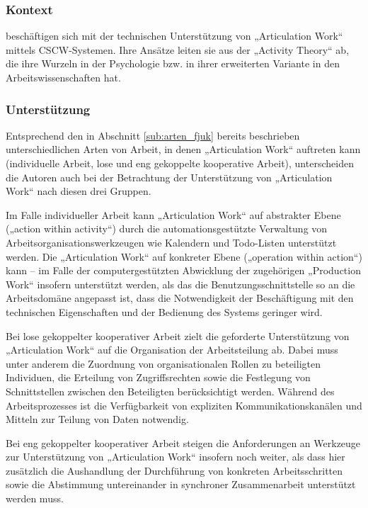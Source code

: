 \subsubsection{Kontext}

\citet{Fjuk97} beschäftigen sich mit der technischen Unterstützung von „Articulation Work“ mittels \gls{CSCW}-Systemen. Ihre Ansätze leiten sie aus der „Activity Theory“ ab, die ihre Wurzeln in der Psychologie \citep{Leontev72} bzw. in ihrer erweiterten Variante in den Arbeitswissenschaften \citep{Engestrom00} hat.
 
\subsubsection{Unterstützung}

Entsprechend den in Abschnitt \ref{sub:arten_fjuk} bereits beschrieben unterschiedlichen Arten von Arbeit, in denen „Articulation Work“ auftreten kann (individuelle Arbeit, lose und eng gekoppelte kooperative Arbeit), unterscheiden die Autoren auch bei der Betrachtung der Unterstützung von „Articulation Work“ nach diesen drei Gruppen.

Im Falle individueller Arbeit kann „Articulation Work“ auf abstrakter Ebene („action within activity“) durch die automationsgestützte Verwaltung von Arbeitsorganisationswerkzeugen wie Kalendern und Todo-Listen unterstützt werden. Die „Articulation Work“ auf konkreter Ebene („operation within action“) kann -- im Falle der computergestützten Abwicklung der zugehörigen „Production Work“ insofern unterstützt werden, als das die Benutzungsschnittstelle so an die Arbeitsdomäne angepasst ist, dass die Notwendigkeit der Beschäftigung mit den technischen Eigenschaften und der Bedienung des Systems geringer wird.

Bei lose gekoppelter kooperativer Arbeit zielt die geforderte Unterstützung von „Articulation Work“ auf die Organisation der Arbeitsteilung ab. Dabei muss unter anderem die Zuordnung von organisationalen Rollen zu beteiligten Individuen, die Erteilung von Zugriffsrechten sowie die Festlegung von Schnittstellen zwischen den Beteiligten berücksichtigt werden. Während des Arbeitsprozesses ist die Verfügbarkeit von expliziten Kommunikationskanälen und Mitteln zur Teilung von Daten notwendig.

Bei eng gekoppelter kooperativer Arbeit steigen die Anforderungen an Werkzeuge zur Unterstützung von „Articulation Work“ insofern noch weiter, als dass hier zusätzlich die Aushandlung der Durchführung von konkreten Arbeitsschritten sowie die Abstimmung untereinander in synchroner Zusammenarbeit unterstützt werden muss.

